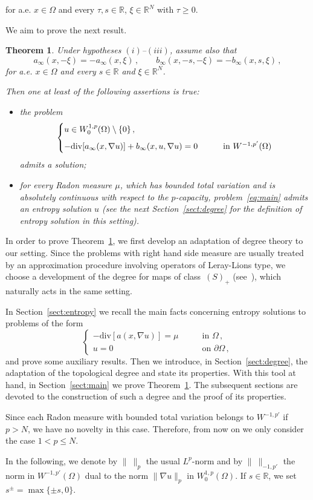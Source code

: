\documentclass[twoside,reqno]{amsart}
\numberwithin{equation}{section}
\newtheorem{thm}{Theorem}[section]
\theoremstyle{definition}
\newcommand{\R}{\mathbb{R}}
\begin{document}
for a.e. $x\in\Omega$ and every $\tau, s \in\R$, $\xi\in\R^N$
with $\tau\geq 0$.
\par
We aim to prove the next result.
%
\begin{thm}
\label{thm:main}
Under hypotheses $(i)$--$(iii)$, assume also that
\begin{equation}
\label{eq:abodd}
a_\infty(x,-\xi) = - a_\infty(x,\xi)\,,\qquad
b_\infty(x,-s,-\xi) = - b_\infty(x,s,\xi)\,,
\end{equation}
for a.e. $x\in \Omega$ and every $s\in\R$ and $\xi\in\R^N$.
\par
Then one at least of the following assertions is true:
\begin{itemize}
\item[$(a)$]
the problem
\[
\begin{cases}
u\in W^{1,p}_0(\Omega)\setminus\{0\}\,,\\
\noalign{\medskip}
- \mathrm{div}[a_{\infty}(x,\nabla u)] 
+ b_{\infty}(x,u,\nabla u)=0
&\qquad\text{in $W^{-1,p'}(\Omega)$}
\end{cases}
\]
admits a solution;
\item[$(b)$]
for every Radon measure $\mu$, which has bounded total variation 
and is absolutely continuous with respect to the $p$-capacity,
problem~\eqref{eq:main} admits an entropy solution $u$
(see the next Section~\ref{sect:degree} for the definition of 
entropy solution in this setting).
\end{itemize}
\end{thm}
%
In order to prove Theorem~\ref{thm:main}, we first develop an
adaptation of degree theory to our setting.
Since the problems with right hand side measure are
usually treated by an approximation procedure
involving operators of Leray-Lions type, 
we choose a development of the degree for maps of class~$(S)_+$ 
(see~\cite{browder1983, oregan_cho_chen2006, skrypnik1994}),
which naturally acts in the same setting.
\par
In Section~\ref{sect:entropy} we recall the main facts
concerning entropy solutions to problems of the form
\[
\begin{cases}
- \mathrm{div}[a(x,\nabla u)]=\mu 
&\qquad\text{in $\Omega$}\,,\\
u=0
&\qquad\text{on $\partial\Omega$}\,,
\end{cases}
\]
and prove some auxiliary results.
Then we introduce, in Section~\ref{sect:degree}, the adaptation 
of the topological degree and state its properties.
With this tool at hand, in Section~\ref{sect:main} we prove 
Theorem~\ref{thm:main}.
The subsequent sections are devoted to the construction of
such a degree and the proof of its properties.
\par
Since each Radon measure with bounded total variation
belongs to $W^{-1,p'}$ if $p>N$, we have no novelty in this case.
Therefore, from now on we only consider the case $1<p\leq N$.
\par
In the following, we denote by $\|~\|_p$ the usual $L^p$-norm 
and by $\|~\|_{-1,p'}$ the norm in $W^{-1,p'}(\Omega)$ dual to 
the norm $\|\nabla u\|_p$ in $W^{1,p}_0(\Omega)$.
If $s\in\R$, we set $s^{\pm}=\max\{\pm s,0\}$.
\end{document}
